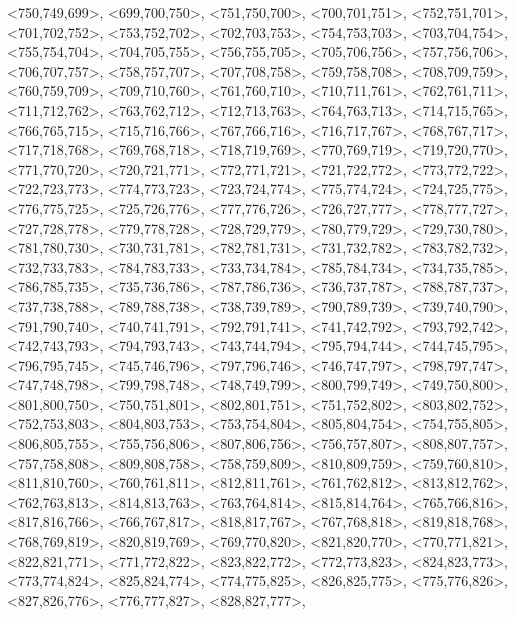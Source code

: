 \documentclass[a4paper,10pt]{article}
\begin{document}
\begin{eulernotebook}
\begin{euleroutput}
  <750,749,699>,
  <699,700,750>,
  <751,750,700>,
  <700,701,751>,
  <752,751,701>,
  <701,702,752>,
  <753,752,702>,
  <702,703,753>,
  <754,753,703>,
  <703,704,754>,
  <755,754,704>,
  <704,705,755>,
  <756,755,705>,
  <705,706,756>,
  <757,756,706>,
  <706,707,757>,
  <758,757,707>,
  <707,708,758>,
  <759,758,708>,
  <708,709,759>,
  <760,759,709>,
  <709,710,760>,
  <761,760,710>,
  <710,711,761>,
  <762,761,711>,
  <711,712,762>,
  <763,762,712>,
  <712,713,763>,
  <764,763,713>,
  <714,715,765>,
  <766,765,715>,
  <715,716,766>,
  <767,766,716>,
  <716,717,767>,
  <768,767,717>,
  <717,718,768>,
  <769,768,718>,
  <718,719,769>,
  <770,769,719>,
  <719,720,770>,
  <771,770,720>,
  <720,721,771>,
  <772,771,721>,
  <721,722,772>,
  <773,772,722>,
  <722,723,773>,
  <774,773,723>,
  <723,724,774>,
  <775,774,724>,
  <724,725,775>,
  <776,775,725>,
  <725,726,776>,
  <777,776,726>,
  <726,727,777>,
  <778,777,727>,
  <727,728,778>,
  <779,778,728>,
  <728,729,779>,
  <780,779,729>,
  <729,730,780>,
  <781,780,730>,
  <730,731,781>,
  <782,781,731>,
  <731,732,782>,
  <783,782,732>,
  <732,733,783>,
  <784,783,733>,
  <733,734,784>,
  <785,784,734>,
  <734,735,785>,
  <786,785,735>,
  <735,736,786>,
  <787,786,736>,
  <736,737,787>,
  <788,787,737>,
  <737,738,788>,
  <789,788,738>,
  <738,739,789>,
  <790,789,739>,
  <739,740,790>,
  <791,790,740>,
  <740,741,791>,
  <792,791,741>,
  <741,742,792>,
  <793,792,742>,
  <742,743,793>,
  <794,793,743>,
  <743,744,794>,
  <795,794,744>,
  <744,745,795>,
  <796,795,745>,
  <745,746,796>,
  <797,796,746>,
  <746,747,797>,
  <798,797,747>,
  <747,748,798>,
  <799,798,748>,
  <748,749,799>,
  <800,799,749>,
  <749,750,800>,
  <801,800,750>,
  <750,751,801>,
  <802,801,751>,
  <751,752,802>,
  <803,802,752>,
  <752,753,803>,
  <804,803,753>,
  <753,754,804>,
  <805,804,754>,
  <754,755,805>,
  <806,805,755>,
  <755,756,806>,
  <807,806,756>,
  <756,757,807>,
  <808,807,757>,
  <757,758,808>,
  <809,808,758>,
  <758,759,809>,
  <810,809,759>,
  <759,760,810>,
  <811,810,760>,
  <760,761,811>,
  <812,811,761>,
  <761,762,812>,
  <813,812,762>,
  <762,763,813>,
  <814,813,763>,
  <763,764,814>,
  <815,814,764>,
  <765,766,816>,
  <817,816,766>,
  <766,767,817>,
  <818,817,767>,
  <767,768,818>,
  <819,818,768>,
  <768,769,819>,
  <820,819,769>,
  <769,770,820>,
  <821,820,770>,
  <770,771,821>,
  <822,821,771>,
  <771,772,822>,
  <823,822,772>,
  <772,773,823>,
  <824,823,773>,
  <773,774,824>,
  <825,824,774>,
  <774,775,825>,
  <826,825,775>,
  <775,776,826>,
  <827,826,776>,
  <776,777,827>,
  <828,827,777>,

\end{euleroutput}
\end{eulernotebook}
\end{document}
